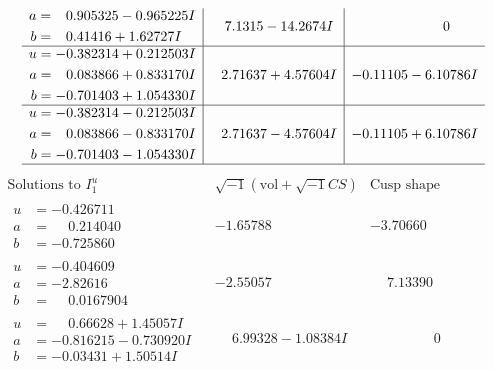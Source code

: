 \documentclass[1p]{elsarticle_modified}
\theoremstyle{definition}
\newcommand{\I}{\sqrt{-1}}
\begin{document}
$$\begin{array}{c|c|c}
\begin{aligned}
a &= \phantom{-}0.905325 - 0.965225 I \\
b &= \phantom{-}0.41416 + 1.62727 I\end{aligned}
 & \phantom{-}7.1315 - 14.2674 I & \phantom{-0.000000 } 0 \\ \hline\begin{aligned}
u &= -0.382314 + 0.212503 I \\
a &= \phantom{-}0.083866 + 0.833170 I \\
b &= -0.701403 + 1.054330 I\end{aligned}
 & \phantom{-}2.71637 + 4.57604 I & -0.11105 - 6.10786 I \\ \hline\begin{aligned}
u &= -0.382314 - 0.212503 I \\
a &= \phantom{-}0.083866 - 0.833170 I \\
b &= -0.701403 - 1.054330 I\end{aligned}
 & \phantom{-}2.71637 - 4.57604 I & -0.11105 + 6.10786 I\\
 \hline 
 \end{array}$$\newpage$$\begin{array}{c|c|c}  
\text{Solutions to }I^u_{1}& \I (\text{vol} + \sqrt{-1}CS) & \text{Cusp shape}\\
 \hline 
\begin{aligned}
u &= -0.426711\phantom{ +0.000000I} \\
a &= \phantom{-}0.214040\phantom{ +0.000000I} \\
b &= -0.725860\phantom{ +0.000000I}\end{aligned}
 & -1.65788\phantom{ +0.000000I} & -3.70660\phantom{ +0.000000I} \\ \hline\begin{aligned}
u &= -0.404609\phantom{ +0.000000I} \\
a &= -2.82616\phantom{ +0.000000I} \\
b &= \phantom{-}0.0167904\phantom{ +0.000000I}\end{aligned}
 & -2.55057\phantom{ +0.000000I} & \phantom{-}7.13390\phantom{ +0.000000I} \\ \hline\begin{aligned}
u &= \phantom{-}0.66628 + 1.45057 I \\
a &= -0.816215 - 0.730920 I \\
b &= -0.03431 + 1.50514 I\end{aligned}
 & \phantom{-}6.99328 - 1.08384 I & \phantom{-0.000000 } 0 \\ \hline\begin{aligned}

\end{aligned}
\end{array}$$
\end{document}
